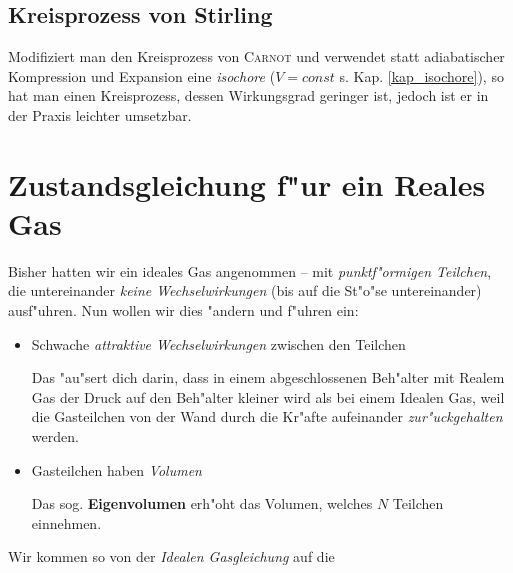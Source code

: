 \subsection{Kreisprozess von Stirling}
\label{kap_kreisprozess-von-stirling}

Modifiziert man den Kreisprozess von \textsc{Carnot} und verwendet
statt adiabatischer Kompression und Expansion eine \emph{isochore} ($V
= const$ s. Kap. \ref{kap_isochore}), so hat man einen Kreisprozess,
dessen Wirkungsgrad geringer ist, jedoch ist er in der Praxis leichter
umsetzbar.










   












\section{Zustandsgleichung f"ur ein Reales Gas}
\label{kap_zustandsgleichung-fur-ein-reales-gas}


Bisher hatten wir ein ideales Gas angenommen -- mit
\emph{punktf"ormigen Teilchen}, die untereinander \emph{keine
  Wechselwirkungen} (bis auf die St"o"se untereinander) ausf"uhren. Nun
wollen wir dies "andern und f"uhren ein:
\begin{itemize}
\item Schwache \emph{attraktive Wechselwirkungen} zwischen den
   Teilchen

   Das "au"sert dich darin, dass in einem abgeschlossenen Beh"alter
   mit Realem Gas der Druck auf den Beh"alter kleiner wird als bei
   einem Idealen Gas, weil die Gasteilchen von der Wand durch die
   Kr"afte aufeinander \emph{zur"uckgehalten} werden.
\item Gasteilchen haben \emph{Volumen}

Das sog. \textbf{Eigenvolumen} erh"oht das Volumen, welches $N$
Teilchen einnehmen.
\end{itemize}


Wir kommen so von der \emph{Idealen Gasgleichung} auf die 

